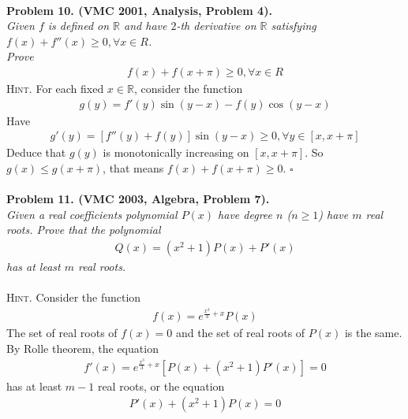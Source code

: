 \documentclass{article}
\numberwithin{equation}{section}
\begin{document}
\\
\textbf{Problem 10. (VMC 2001, Analysis, Problem 4).}\\
\textit{Given $f$ is defined on $\mathbb{R}$ and have $2$-th derivative on $\mathbb{R}$ satisfying $f\left( x \right) + f''\left( x \right) \ge 0,\forall x \in R$.\\
Prove}
\begin{align}
f\left( x \right) + f\left( {x + \pi } \right) \ge 0,\forall x \in R
\end{align}
\textsc{Hint.} For each fixed $x \in \mathbb{R}$, consider the function
\begin{align}
g\left( y \right) = f'\left( y \right)\sin \left( {y - x} \right) - f\left( y \right)\cos \left( {y - x} \right)
\end{align}
Have
\begin{align}
g'\left( y \right) = \left[ {f''\left( y \right) + f\left( y \right)} \right]\sin \left( {y - x} \right) \ge 0,\forall y \in \left[ {x,x + \pi } \right]
\end{align}
Deduce that $g(y)$ is monotonically increasing on $\left[ {x,x + \pi } \right]$. So $g\left( x \right) \le g\left( {x + \pi } \right)$, that means $f\left( x \right) + f\left( {x + \pi } \right) \ge 0$. \hfill $\square$\\
\\
\textbf{Problem 11. (VMC 2003, Algebra, Problem 7).}\\
\textit{Given a real coefficients polynomial $P(x)$ have degree $n$ ($n \ge 1$) have $m$ real roots. Prove that the polynomial
\begin{align}
Q\left( x \right) = \left( {{x^2} + 1} \right)P\left( x \right) + P'\left( x \right)
\end{align}
has at least $m$ real roots.}\\
\\
\textsc{Hint.} Consider the function
\begin{align}
f\left( x \right) = {e^{\frac{{{x^3}}}{3} + x}}P\left( x \right)
\end{align}
The set of real roots of $f(x)=0$ and the set of real roots of $P(x)$ is the same. By Rolle theorem, the equation 
\begin{align}
f'\left( x \right) = {e^{\frac{{{x^3}}}{3} + x}}\left[ {P\left( x \right) + \left( {{x^2} + 1} \right)P'\left( x \right)} \right] = 0
\end{align}
has at least $m-1$ real roots, or the equation
\begin{align}
P'\left( x \right) + \left( {{x^2} + 1} \right)P\left( x \right) = 0
\end{align}
\end{document}
